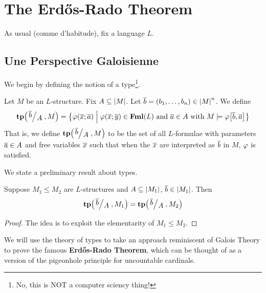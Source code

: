 \section{The Erd\H{o}s-Rado Theorem}

As usual (comme d'habitude), fix a language $L$.

\subsection{Une Perspective Galoisienne}

We begin by defining the notion of a type\footnote{No, this is NOT a computer sciency thing!}.
\begin{boxdefinition}[Type]
    Let $M$ be an $L$-structure. Fix $A \subseteq \left\lvert M \right\rvert$.
    Let $\overline{b} = \left( b_1, \ldots, b_n \right) \in \left\lvert M \right\rvert^n$. We define
    \begin{align*}
        \tp\of{\quotient{\ol{b}}{A}, M}
        =
        \setst{\varphi\of{\ol{x}; \ol{a}}}{\vp\of{\ol{x}; \ol{y}} \in \Fml(L) \text{ and } \ol{a} \in A \text{ with } M \models \vp\!\brac{\ol{b}, \ol{a}}}
    \end{align*}
    That is, we define $\tp\of{\quotient{\ol{b}}{A}, M}$ to be the set of all $L$-formulae with parameters $\overline{a} \in A$ and free variables $\overline{x}$ such that when the $\overline{x}$ are interpreted as $\overline{b}$ in $M$, $\varphi$ is satisfied.
\end{boxdefinition}

We state a preliminary result about types.

\begin{boxlemma}
   Suppose $M_1 \leq M_2$ are $L$-structures and $A \subseteq \left\lvert M_1 \right\rvert$, $\overline{b} \in \left\lvert M_1 \right\rvert$. Then
   \begin{align*}
       \tp\of{\quotient{\ol{b}}{A}, M_1} = 
       \tp\of{\quotient{\ol{b}}{A}, M_2}
   \end{align*}
\end{boxlemma}
\begin{proof}
    The idea is to exploit the elementarity of $M_1 \leq M_2$. \sorry
\end{proof}

We will use the theory of types to take an approach reminiscent of Galois Theory to prove the famous \textbf{Erd\H{o}s-Rado Theorem}, which can be thought of as a version of the pigeonhole principle for uncountable cardinals.

